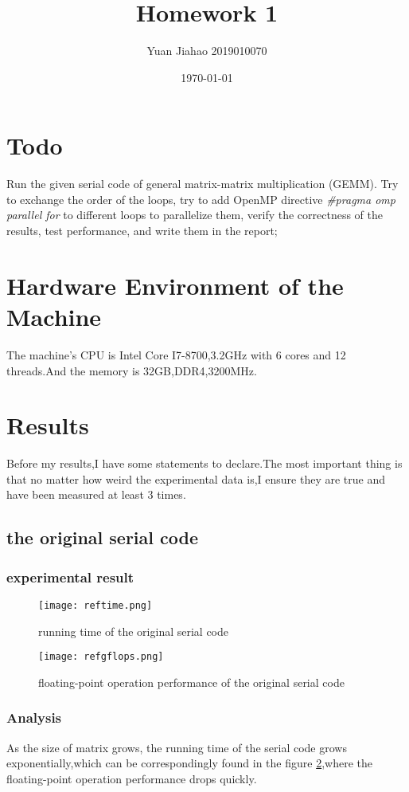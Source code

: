 \documentclass[11pt]{scrartcl} %
\title{	
	Homework 1
}
\author{Yuan Jiahao 2019010070} %
\date{\normalsize\today} %
\begin{document}
\maketitle %


\section{Todo}
Run the given serial code of general matrix-matrix multiplication (GEMM). Try to
exchange the order of the loops, try to add OpenMP directive \textit{\#pragma omp parallel for} to
different loops to parallelize them, verify the correctness of the results, test performance, and
write them in the report;
\section{Hardware Environment of the Machine }
The machine's CPU is Intel Core I7-8700,3.2GHz with 6 cores and 12 threads.And the memory is 32GB,DDR4,3200MHz.
\section{Results}
Before my results,I have some statements to declare.The most important thing is that no matter how weird the experimental data is,I ensure they are true and have been measured at least 3 times.\label{abcc}
\subsection{the original serial code}
	\subsubsection{experimental result}
		\begin{figure}[H]
			\centering
			\texttt{[image: reftime.png]}
			\caption{running time of the original serial code}
			\label{}
		\end{figure}
		\begin{figure}[H]
			\centering
			\texttt{[image: refgflops.png]}
			\caption{floating-point operation performance of the original serial code}
			\label{daf}
		\end{figure}
	\subsubsection{Analysis}
	As the size of matrix grows, the running time of the serial code grows exponentially,which can be correspondingly found in the figure \ref{daf},where the floating-point operation performance drops quickly.
\end{document}
